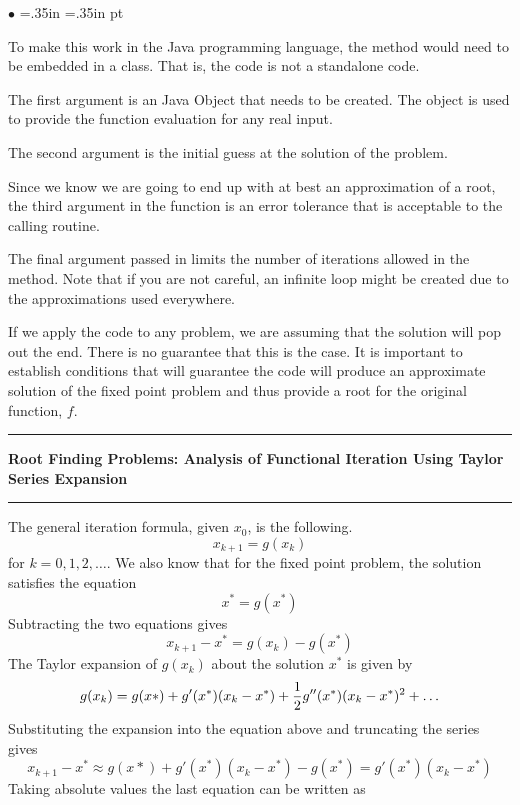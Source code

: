 \documentclass[10pt,fleqn]{article}
\begin{document}
\begin{list}{$\bullet$}{ \parsep=0pt \listparindent=0pt
\topsep=0pt \rightmargin=.35in \leftmargin=.35in  pt
\itemsep=2pt}
  \item To make this work in the Java programming language, the method would
        need to be embedded in a class. That is, the code is not a standalone
        code.
  \item The first argument is an Java Object that needs to be created. The
        object is used to provide the function evaluation for any real input.
  \item The second argument is the initial guess at the solution of the problem.
  \item Since we know we are going to end up with at best an approximation of
        a root, the third argument in the function is an error tolerance that is
        acceptable to the calling routine.
  \item The final argument passed in limits the number of iterations allowed in
        the method. Note that if you are not careful, an infinite loop might be
        created due to the approximations used everywhere.
\end{list}
If we apply the code to any problem, we are assuming that the solution will pop
out the end. There is no guarantee that this is the case. It is important to
establish conditions that will guarantee the code will produce an approximate
solution of the fixed point problem and thus provide a root for the original
function, $f$.
\vskip0.1in\hrule\vskip0.1in
\noindent
{\bf Root Finding Problems: Analysis of Functional Iteration Using Taylor
 Series Expansion} 
\vskip0.1in\hrule\vskip0.1in
\noindent
The general iteration formula, given $x_0$, is the following.
$$
  x_{k+1} = g(x_k)
$$
for $k=0,1,2,\ldots$. We also know that for the fixed point problem, the
solution satisfies the equation
$$
  x^* = g(x^*)
$$
Subtracting the two equations gives
$$
  x_{k+1} - x^* = g(x_k) - g(x^*)
$$
The Taylor expansion of $g(x_k)$ about the solution $x^*$ is given by
$$
  g(x_k) = g(x*) + g'(x^*) ( x_k - x^* ) + {1\over 2} g''(x^*) ( x_k - x^* )^2
              + \ldots
$$
Substituting the expansion into the equation above and truncating the series
gives
$$
  x_{k+1} - x^* \approx g(x*) + g'(x^*) ( x_k - x^* ) - g(x^*)
                       = g'(x^*) ( x_k - x^* )
$$
Taking absolute values the last equation can be written as
\end{document}
